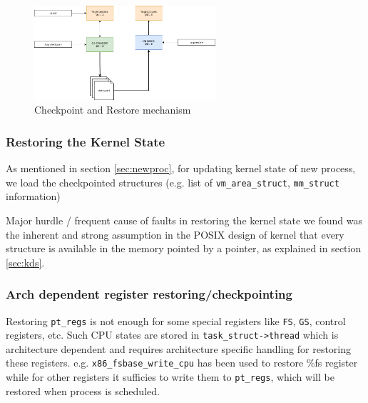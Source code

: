 \documentclass[a4paper,12pt]{article}
\begin{document}
\begin{figure}[b]
    \centering
    \includegraphics[width=0.6\textwidth]{crp.png}
    \caption{Checkpoint and Restore mechanism}
    \label{fig:crp}
\end{figure}

\label{sec:newproc}
\subsubsection{Restoring the Kernel State}
As mentioned in section \ref{sec:newproc}, for updating kernel state of new process, we load the checkpointed structures (e.g. list of \verb|vm_area_struct|, \verb|mm_struct| information)

Major hurdle / frequent cause of faults in restoring the kernel state we found was the inherent and strong assumption in the POSIX design of kernel that every structure is available in the memory pointed by a pointer, as explained in section \ref{sec:kds}.

\subsubsection{Arch dependent register restoring/checkpointing}
Restoring \verb|pt_regs| is not enough for some special registers like \verb|FS|, \verb|GS|, control registers, etc. Such CPU states are stored in \verb|task_struct->thread| which is architecture dependent and requires architecture specific handling for restoring these registers. e.g. \verb|x86_fsbase_write_cpu|  has been used to restore \%fs register while for other registers it sufficies to write them to \verb|pt_regs|, which will be restored when process is scheduled.

\end{document}
